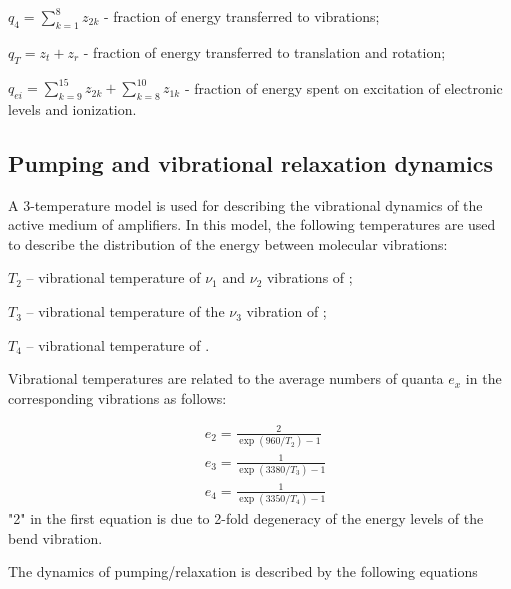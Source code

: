 \documentclass{report}
\begin{document}
$q_4 = \sum\limits_{k=1}^8 z_{2k}$ - fraction of energy transferred to  vibrations;

$q_T = z_t + z_r$ - fraction of energy transferred to translation and rotation;

$q_{ei} = \sum\limits_{k=9}^{15} z_{2k}  + \sum\limits_{k=8}^{10} z_{1k}$ - fraction of energy spent on excitation of electronic levels and ionization.



\subsection{Pumping and vibrational relaxation dynamics}
A 3-temperature model is used for describing the vibrational dynamics of the active medium of  amplifiers. In this model, the following temperatures are used to describe the distribution of the energy between molecular vibrations:

$T_2$ – vibrational temperature of $\nu_1$ and $\nu_2$ vibrations of ;

$T_3$ – vibrational temperature of the $\nu_3$ vibration of ;

$T_4$ – vibrational temperature of .

Vibrational temperatures are related to the average numbers of quanta $e_x$ in the corresponding vibrations as follows:

\begin{equation}\label{eq:e}
\begin{aligned}
&{e_2} = \frac{2}{\exp(960/{T_2})-1}\\
&{e_3} = \frac{1}{\exp(3380/{T_3})-1}\\
&{e_4} = \frac{1}{\exp(3350/{T_4})-1} 
\end{aligned}
\end{equation}
"2" in the first equation is due to 2-fold degeneracy of the energy levels of the bend vibration.

The dynamics of pumping/relaxation is described by the following equations
\end{document}
